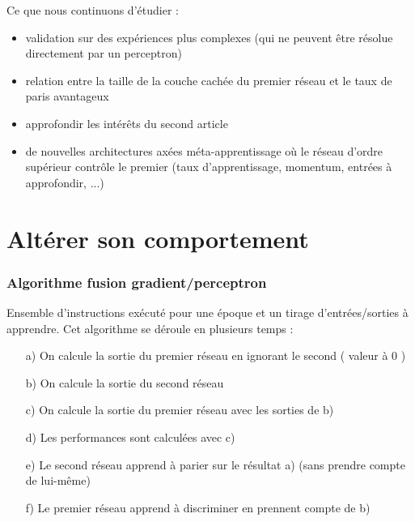 \documentclass[a4paper,12pt, twoside]{article}
\begin{document}
Ce que nous continuons d'étudier : 
\begin{itemize}
 \item validation sur des expériences plus complexes (qui ne peuvent être résolue directement par un perceptron)
 \item relation entre la taille de la couche cachée du premier réseau et le taux de paris avantageux
 \item approfondir les intérêts du second article \cite{Pasquali_2010}
 \item de nouvelles architectures axées méta-apprentissage où le réseau d'ordre supérieur contrôle le premier
 (taux d'apprentissage, momentum, entrées à approfondir, ...)
\end{itemize}


\newpage
\part{Altérer son comportement}


\newpage



\newpage
\appendix
\section{Algorithme fusion gradient/perceptron}

Ensemble d'instructions exécuté pour une époque et un tirage d'entrées/sorties à apprendre.
\newline
Cet algorithme se déroule en plusieurs temps :
\begin{itemize}
 \item[a)] On calcule la sortie du premier réseau en ignorant le second ( valeur à 0 )
 \item[b)] On calcule la sortie du second réseau
 \item[c)] On calcule la sortie du premier réseau avec les sorties de b)
 \item[d)] Les performances sont calculées avec c)
 \item[e)] Le second réseau apprend à parier sur le résultat a) (sans prendre compte de lui-même)
 \item[f)] Le premier réseau apprend à discriminer en prennent compte de b)
 \\[0.7cm]
\end{itemize}
\end{document}
